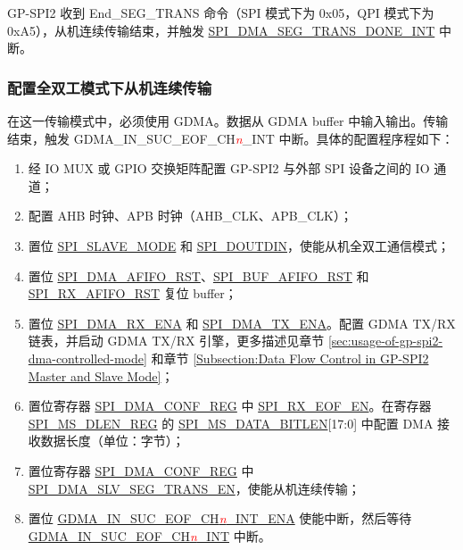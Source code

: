 \documentclass[main\_\_CN.tex]{subfiles}
\begin{document}
GP-SPI2 收到 End\_SEG\_TRANS 命令（SPI 模式下为 0x05，QPI 模式下为 0xA5），从机连续传输结束，并触发 \hyperref[int:SPIDMASEGTRANSDONEINT]{SPI\_DMA\_SEG\_TRANS\_DONE\_INT} 中断。

\subsubsection{配置全双工模式下从机连续传输}\label{sec:gp-spi2-slave-fd-seg-trans}
在这一传输模式中，必须使用 GDMA。数据从 GDMA buffer 中输入输出。传输结束，触发 GDMA\_IN\_SUC\_EOF\_CH\textcolor{red}{\it{n}}\_INT  中断。具体的配置程序程如下：

\begin{enumerate}
   \item 经 IO MUX 或 GPIO 交换矩阵配置 GP-SPI2 与外部 SPI 设备之间的 IO 通道；
   \item 配置 AHB 时钟、APB 时钟（AHB\_CLK、APB\_CLK）；

    \item 置位 \hyperref[fielddesc:SPISLAVEMODE]{SPI\_SLAVE\_MODE} 和 \hyperref[fielddesc:SPIDOUTDIN]{SPI\_DOUTDIN}，使能从机全双工通信模式；

    \item 置位 \hyperref[fielddesc:SPIDMAAFIFORST]{SPI\_DMA\_AFIFO\_RST}、\hyperref[fielddesc:SPIBUFAFIFORST]{SPI\_BUF\_AFIFO\_RST} 和 \hyperref[fielddesc:SPIRXAFIFORST]{SPI\_RX\_AFIFO\_RST} 复位 buffer；

    \item 置位 \hyperref[fielddesc:SPIDMARXENA]{SPI\_DMA\_RX\_ENA} 和 \hyperref[fielddesc:SPIDMATXENA]{SPI\_DMA\_TX\_ENA}。配置 GDMA TX/RX 链表，并启动 GDMA TX/RX 引擎，更多描述见章节 \ref{sec:usage-of-gp-spi2-dma-controlled-mode} 和章节 \ref{Subsection:Data Flow Control in GP-SPI2 Master and Slave Mode}；

    \item 置位寄存器 \hyperref[regdesc:SPIDMACONFREG]{SPI\_DMA\_CONF\_REG} 中 \hyperref[fielddesc:SPIRXEOFEN]{SPI\_RX\_EOF\_EN}。在寄存器 \hyperref[regdesc:SPIMSDLENREG]{SPI\_MS\_DLEN\_REG} 的 \hyperref[fielddesc:SPIMSDATABITLEN]{SPI\_MS\_DATA\_BITLEN}[17:0] 中配置 DMA 接收数据长度（单位：字节）；

    \item 置位寄存器 \hyperref[regdesc:SPIDMACONFREG]{SPI\_DMA\_CONF\_REG} 中 \hyperref[fielddesc:SPIDMASLVSEGTRANSEN]{SPI\_DMA\_SLV\_SEG\_TRANS\_EN}，使能从机连续传输；

    \item 置位 \hyperref[fielddesc:GDMAINSUCEOFCH0INTENA]{GDMA\_IN\_SUC\_EOF\_CH\textcolor{red}{\it{n}}\_INT\_ENA}  使能中断，然后等待 \hyperref[int:GDMAINSUCEOFINT]{GDMA\_IN\_SUC\_EOF\_CH\textcolor{red}{\it{n}}\_INT} 中断。
\end{enumerate}
\end{document}

